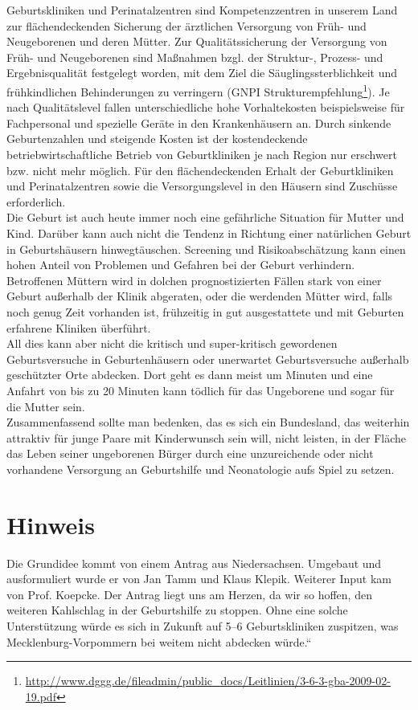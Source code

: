 Geburtskliniken und Perinatalzentren sind Kompetenzzentren in unserem Land zur flächendeckenden Sicherung der ärztlichen Versorgung von Früh- und Neugeborenen und deren Mütter. Zur Qualitätssicherung der Versorgung von Früh- und Neugeborenen sind Maßnahmen bzgl. der Struktur-, Prozess- und Ergebnisqualität festgelegt worden, mit dem Ziel die Säuglingssterblichkeit und frühkindlichen Behinderungen zu verringern (GNPI Strukturempfehlung\footnote{\url{http://www.dggg.de/fileadmin/public\_docs/Leitlinien/3-6-3-gba-2009-02-19.pdf}}). Je nach Qualitätslevel fallen unterschiedliche hohe Vorhaltekosten beispielsweise für Fachpersonal und spezielle Geräte in den Krankenhäusern an. Durch sinkende Geburtenzahlen und steigende Kosten ist der kostendeckende betriebwirtschaftliche Betrieb von Geburtkliniken je nach Region nur erschwert bzw. nicht mehr möglich. Für den flächendeckenden Erhalt der Geburtkliniken und Perinatalzentren sowie die Versorgungslevel in den Häusern sind Zuschüsse erforderlich.\\Die Geburt ist auch heute immer noch eine gefährliche Situation für Mutter und Kind. Darüber kann auch nicht die Tendenz in Richtung einer natürlichen Geburt in Geburtshäusern hinwegtäuschen. Screening und Risikoabschätzung kann einen hohen Anteil von Problemen und Gefahren bei der Geburt verhindern. Betroffenen Müttern wird in dolchen prognostizierten Fällen stark von einer Geburt außerhalb der Klinik abgeraten, oder die werdenden Mütter wird, falls noch genug Zeit vorhanden ist, frühzeitig in gut ausgestattete und mit Geburten erfahrene Kliniken überführt.\\All dies kann aber nicht die kritisch und super-kritisch gewordenen Geburtsversuche in Geburtenhäusern oder unerwartet Geburtsversuche außerhalb geschützter Orte abdecken. Dort geht es dann meist um Minuten und eine Anfahrt von bis zu 20 Minuten kann tödlich für das Ungeborene und sogar für die Mutter sein.\\Zusammenfassend sollte man bedenken, das es sich ein Bundesland, das weiterhin attraktiv für junge Paare mit Kinderwunsch sein will, nicht leisten, in der Fläche das Leben seiner ungeborenen Bürger durch eine unzureichende oder nicht vorhandene Versorgung an Geburtshilfe und Neonatologie aufs Spiel zu setzen.

\section{Hinweis}

Die Grundidee kommt von einem Antrag aus Niedersachsen. Umgebaut und ausformuliert wurde er von Jan Tamm und Klaus Klepik. Weiterer Input kam von Prof. Koepcke. Der Antrag liegt uns am Herzen, da wir so hoffen, den weiteren Kahlschlag in der Geburtshilfe zu stoppen. Ohne eine solche Unterstützung würde es sich in Zukunft auf 5--6 Geburtskliniken zuspitzen, was Mecklenburg-Vorpommern bei weitem nicht abdecken würde.``
